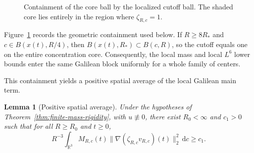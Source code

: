 \documentclass{interact}
\numberwithin{equation}{section}
\theoremstyle{plain}
\newtheorem{lemma}[theorem]{Lemma}
\theoremstyle{definition}
\theoremstyle{remark}
\newcommand{\R}{\mathbb R}
\newcommand{\dd}{\,\mathrm d}
\begin{document}
\begin{figure}[htbp]
\centering
{}
\caption{Containment of the core ball by the localized cutoff ball. The shaded core lies entirely in the region where $\zeta_{R,c}=1$.}
\label{fig:core-inclusion}
\end{figure}

Figure~\ref{fig:core-inclusion} records the geometric containment used below. If $R\ge8R_*$ and $c\in B(x(t),R/4)$, then $B(x(t),R_*)\subset B(c,R)$, so the cutoff equals one on the entire concentration core. Consequently, the local mass and local $L^6$ lower bounds enter the same Galilean block uniformly for a whole family of centers.

This containment yields a positive spatial average of the local Galilean main term.

\begin{lemma}[Positive spatial average]\label{lem:positive-spatial-average}
Under the hypotheses of Theorem~\ref{thm:finite-mass-rigidity}, with $u\not\equiv0$, there exist $R_0<\infty$ and $c_1>0$ such that for all $R\ge R_0$ and $t\ge0$,
\begin{equation}\label{eq:positive-spatial-average}
 R^{-3}\int_{\R^3}M_{R,c}(t)
 \|\nabla(\zeta_{R,c}v_{R,c})(t)\|_2^2\dd c
 \ge c_1.
\end{equation}
\end{lemma}
\end{document}
